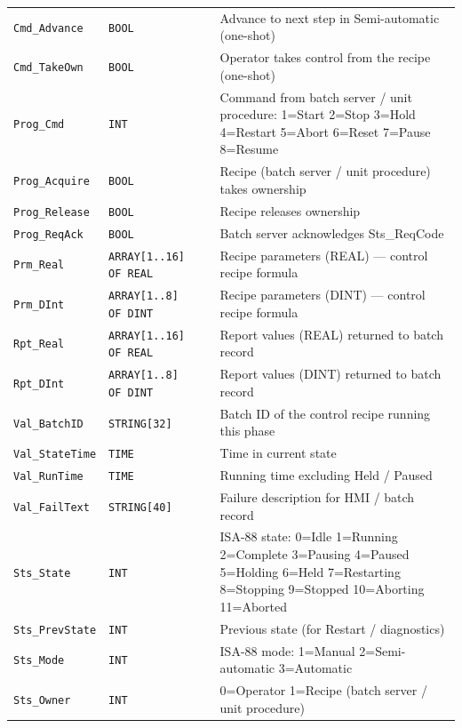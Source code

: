 \begin{small}
\begin{longtable}{@{}P{3.70cm}P{2.20cm}P{1.70cm}P{8.91cm}@{}}
\texttt{Cmd\_Advance} & \texttt{BOOL} &  & Advance to next step in Semi-automatic (one-shot) \\
\texttt{Cmd\_TakeOwn} & \texttt{BOOL} &  & Operator takes control from the recipe (one-shot) \\
\texttt{Prog\_Cmd} & \texttt{INT} &  & Command from batch server /\allowbreak{} unit procedure: 1=Start 2=Stop 3=Hold 4=Restart 5=Abort 6=Reset 7=Pause 8=Resume \\
\texttt{Prog\_Acquire} & \texttt{BOOL} &  & Recipe (batch server /\allowbreak{} unit procedure) takes ownership \\
\texttt{Prog\_Release} & \texttt{BOOL} &  & Recipe releases ownership \\
\texttt{Prog\_ReqAck} & \texttt{BOOL} &  & Batch server acknowledges Sts\_ReqCode \\
\texttt{Prm\_Real} & \texttt{ARRAY[1..16] OF REAL} &  & Recipe parameters (REAL) --- control recipe formula \\
\texttt{Prm\_DInt} & \texttt{ARRAY[1..8] OF DINT} &  & Recipe parameters (DINT) --- control recipe formula \\
\texttt{Rpt\_Real} & \texttt{ARRAY[1..16] OF REAL} &  & Report values (REAL) returned to batch record \\
\texttt{Rpt\_DInt} & \texttt{ARRAY[1..8] OF DINT} &  & Report values (DINT) returned to batch record \\
\texttt{Val\_BatchID} & \texttt{STRING[32]} &  & Batch ID of the control recipe running this phase \\
\texttt{Val\_StateTime} & \texttt{TIME} &  & Time in current state \\
\texttt{Val\_RunTime} & \texttt{TIME} &  & Running time excluding Held /\allowbreak{} Paused \\
\texttt{Val\_FailText} & \texttt{STRING[40]} &  & Failure description for HMI /\allowbreak{} batch record \\
\texttt{Sts\_State} & \texttt{INT} &  & ISA-88 state: 0=Idle 1=Running 2=Complete 3=Pausing 4=Paused 5=Holding 6=Held 7=Restarting 8=Stopping 9=Stopped 10=Aborting 11=Aborted \\
\texttt{Sts\_PrevState} & \texttt{INT} &  & Previous state (for Restart /\allowbreak{} diagnostics) \\
\texttt{Sts\_Mode} & \texttt{INT} &  & ISA-88 mode: 1=Manual 2=Semi-automatic 3=Automatic \\
\texttt{Sts\_Owner} & \texttt{INT} &  & 0=Operator 1=Recipe (batch server /\allowbreak{} unit procedure) \\

\end{longtable}
\end{small}
